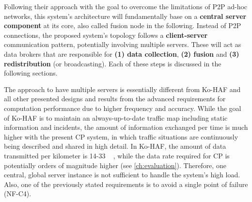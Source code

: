 Following their approach with the goal to overcome the limitations of P2P ad-hoc networks, this system's architecture will fundamentally base on a \textbf{central server component} at its core, also called fusion node in the following. Instead of P2P connections, the proposed system's topology follows a \textbf{client-server} communication pattern, potentially involving multiple servers. These will act as data brokers that are responsible for \textbf{(1) data collection}, \textbf{(2) fusion} and \textbf{(3) redistribution} (or broadcasting). Each of these steps is discussed in the following sections.

The approach to have multiple servers is essentially different from Ko-HAF and all other presented designs and results from the advanced requirements for computation performance due to higher frequency and accuracy. While the goal of Ko-HAF is to maintain an always-up-to-date traffic map including static information and incidents, the amount of information exchanged per time is much higher with the present CP system, in which traffic situations are continuously being described and shared in high detail. In Ko-HAF, the amount of data transmitted per kilometer is 14-33 \si{\kilo\byte} \cite{Hohm2019}, while the data rate required for CP is potentially orders of magnitude higher (see \cref{ch:evaluation}). Therefore, one central, global server instance is not sufficient to handle the system's high load. Also, one of the previously stated requirements is to avoid a single point of failure (NF-C4). 

